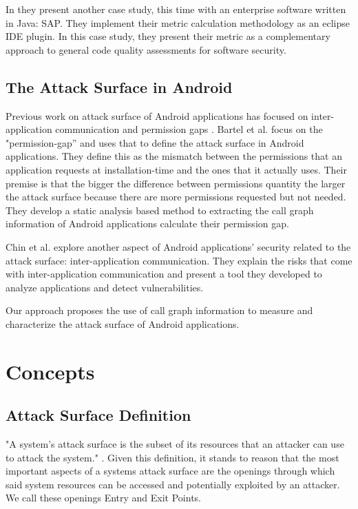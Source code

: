 \documentclass{sig-alternate}
\begin{document}
In \cite{manadhata2009report} they present another case study, this time with an enterprise software written in Java: SAP. They implement their metric calculation methodology as an eclipse IDE plugin. In this case study, they present their metric as a complementary approach to general code quality assessments for software security.

\subsection{The Attack Surface in Android}

Previous work on attack surface of Android applications has focused on inter-application communication \cite{chin_analyzing_2011} and permission gaps \cite{bartel_automatically_2012}. Bartel et al. \cite{bartel_automatically_2012} focus on the "permission-gap” and uses that to define the attack surface in Android applications. They define this as the mismatch between the permissions that an application requests at installation-time and the ones that it actually uses. Their premise is that the bigger the difference between permissions quantity the larger the attack surface because there are more permissions requested but not needed. They develop a static analysis based method to extracting the call graph information of Android applications calculate their permission gap.

Chin et al. \cite{chin_analyzing_2011} explore another aspect of Android applications' security related to the attack surface: inter-application communication. They explain the risks that come with inter-application communication and present a tool they developed to analyze applications and detect vulnerabilities.

Our approach proposes the use of call graph information to measure and characterize the attack surface of Android applications.

\section{Concepts}

\subsection{Attack Surface Definition}

"A system's attack surface is the subset of its resources that an attacker can use to attack the system." \cite{Manadhata2011AnAttackSurfaceMetric}. Given this definition, it stands to reason that the most important aspects of a systems attack surface are the openings through which said system resources can be accessed and potentially exploited by an attacker. We call these openings Entry and Exit Points.
\end{document}
